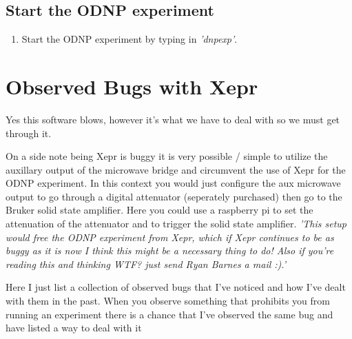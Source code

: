 \documentclass{article}
\newcommand{\fc}[1]{{\color{blue}\textit{'{#1}'}}}
\begin{document}
\subsection{Start the ODNP experiment}
\begin{enumerate} 
    \item Start the ODNP experiment by typing in \fc{dnpexp}.
\end{enumerate}




\section{Observed Bugs with Xepr}
Yes this software blows, however it's what we have to deal with so we must get through it.

On a side note being Xepr is buggy it is very possible / simple to utilize the auxillary output of the microwave bridge and circumvent the use of Xepr for the ODNP experiment. In this context you would just configure the aux microwave output to go through a digital attenuator (seperately purchased) then go to the Bruker solid state amplifier. Here you could use a raspberry pi to set the attenuation of the attenuator and to trigger the solid state amplifier. \fc{This setup would free the ODNP experiment from Xepr, which if Xepr continues to be as buggy as it is now I think this might be a necessary thing to do! Also if you're reading this and thinking WTF? just send Ryan Barnes a mail :).}

Here I just list a collection of observed bugs that I've noticed and how I've dealt with them in the past. When you observe something that prohibits you from running an experiment there is a chance that I've observed the same bug and have listed a way to deal with it 
\end{document}
